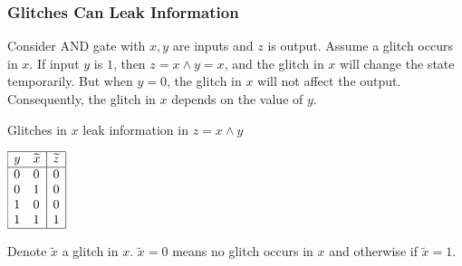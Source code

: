 \documentclass[
    aspectratio=169,                   %
]{beamer}
\begin{document}
    \begin{frame}
        \frametitle{Glitches Can Leak Information}

        \begin{example}
            
            Consider AND gate with $ x,y $ are inputs and $ z $ is output. 
            Assume a glitch occurs in $ x $. If input $ y $ is $ 1 $, then $ z=x\land y=x $, and the glitch in $ x $ will 
            change the state temporarily. But when $ y=0 $, the glitch in $ x $ will not affect the output. Consequently, 
            the glitch in $ x $ depends on the value of $ y $.
            \begin{table}
                \caption{Glitches in $ x $ leak information in $ z=x\land y $}
                $\begin{array}{|ll|c|}
                    \hline 
                    y & \widetilde{x} & \widetilde{z} \\
                    \hline 
                    0 & 0 & 0  \\
                    0 & 1 & 0  \\
                    1 & 0 & 0  \\
                    1 & 1 & 1  \\
                    \hline
                \end{array}$
            \end{table}

            Denote $ \widetilde{x} $ a glitch in $ x $. $ \widetilde{x}=0 $ means no glitch occurs in $ x $ and otherwise if 
            $ \widetilde{x}=1 $.
        \end{example}
    \end{frame}
\end{document}
